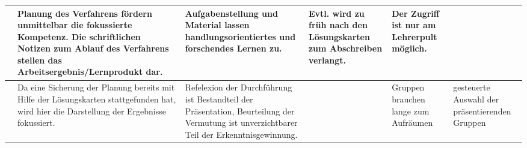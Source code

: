 \begin{longtable}{>{\small\raggedright}lYYYYY}
 &
Planung des Verfahrens fördern unmittelbar die fokussierte Kompetenz. Die schriftlichen Notizen zum Ablauf des Verfahrens stellen das 
	Arbeitsergebnis/Lernprodukt dar. &
Aufgabenstellung und Material lassen handlungsorientiertes und forschendes Lernen zu. & 
Evtl. wird zu früh nach den Lösungskarten zum Abschreiben verlangt. &
Der Zugriff ist nur am Lehrerpult möglich.
\\ \midrule%
%
%
 &
Da eine Sicherung der Planung bereits mit Hilfe der Lösungskarten stattgefunden hat, wird hier die Darstellung der Ergebnisse fokussiert. &
Refelexion der  Durch\-füh\-rung ist Bestandteil der Präsentation, Beurteilung der Vermutung ist unverzichtbarer Teil der Erkenntnisgewinnung. & 
& 
Gruppen brauchen lange zum Aufräumen & 
gesteuerte Auswahl der präsentierenden Gruppen
\\ \midrule%
%
%

\end{longtable}
